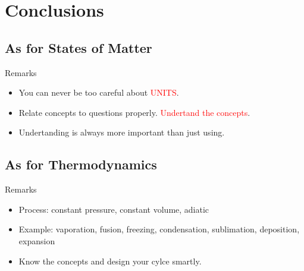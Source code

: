 \documentclass[12pt,compress]{beamer}
\begin{document}

\section{Conclusions}

\subsection{As for States of Matter}
\begin{frame}{Remarks}
	\begin{itemize}
		\item You can never be too careful about \textcolor{red}{UNITS}.
		\item Relate concepts to questions properly. \textcolor{red}{Undertand the concepts}.
		\item Undertanding is always more important than just using.
	\end{itemize}
\end{frame}

\subsection{As for Thermodynamics}
\begin{frame}{Remarks}
	\begin{itemize}
		\item Process: constant pressure, constant volume, adiatic
		\item Example: vaporation, fusion, freezing, condensation, sublimation, deposition, expansion
		\item Know the concepts and design your cylce smartly.
	\end{itemize}
\end{frame}

\end{document}
